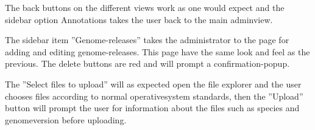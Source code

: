 The back buttons on the different views work as one would expect and the sidebar option Annotations takes the user back to the main adminview.

The sidebar item ''Genome-releases'' takes the administrator to the page for adding and editing genome-releases. This page have the same look and feel as the previous. The delete buttons are red and will prompt a confirmation-popup. 

The ''Select files to upload'' will as expected open the file explorer and the user chooses files according to normal operativesystem standards, then the ''Upload'' button will prompt the user for information about the files such as species and genomeversion before uploading. 